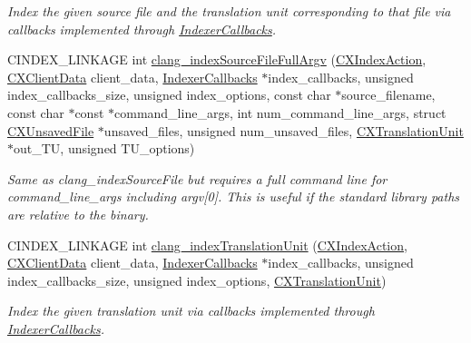 \begin{DoxyCompactItemize}
\begin{DoxyCompactList}\small\item\em Index the given source file and the translation unit corresponding to that file via callbacks implemented through \mbox{\hyperlink{structIndexerCallbacks}{Indexer\+Callbacks}}. \end{DoxyCompactList}\item 
\mbox{\label{group__CINDEX__HIGH_ga3b08166c97a48146a4a0395876332327}} 
C\+I\+N\+D\+E\+X\+\_\+\+L\+I\+N\+K\+A\+GE int \mbox{\hyperlink{group__CINDEX__HIGH_ga3b08166c97a48146a4a0395876332327}{clang\+\_\+index\+Source\+File\+Full\+Argv}} (\mbox{\hyperlink{group__CINDEX__HIGH_gac8d30d3e3fb34d887b611e7c6de3afb6}{C\+X\+Index\+Action}}, \mbox{\hyperlink{group__CINDEX_gacfa40c3de26d228c0d898403c2c21612}{C\+X\+Client\+Data}} client\+\_\+data, \mbox{\hyperlink{structIndexerCallbacks}{Indexer\+Callbacks}} $\ast$index\+\_\+callbacks, unsigned index\+\_\+callbacks\+\_\+size, unsigned index\+\_\+options, const char $\ast$source\+\_\+filename, const char $\ast$const $\ast$command\+\_\+line\+\_\+args, int num\+\_\+command\+\_\+line\+\_\+args, struct \mbox{\hyperlink{structCXUnsavedFile}{C\+X\+Unsaved\+File}} $\ast$unsaved\+\_\+files, unsigned num\+\_\+unsaved\+\_\+files, \mbox{\hyperlink{group__CINDEX_gacdb7815736ca709ce9a5e1ec2b7e16ac}{C\+X\+Translation\+Unit}} $\ast$out\+\_\+\+TU, unsigned T\+U\+\_\+options)
\begin{DoxyCompactList}\small\item\em Same as clang\+\_\+index\+Source\+File but requires a full command line for {\ttfamily command\+\_\+line\+\_\+args} including argv\mbox{[}0\mbox{]}. This is useful if the standard library paths are relative to the binary. \end{DoxyCompactList}\item 
C\+I\+N\+D\+E\+X\+\_\+\+L\+I\+N\+K\+A\+GE int \mbox{\hyperlink{group__CINDEX__HIGH_gab12a0795c7d7be6e7ec85679faf3f8e9}{clang\+\_\+index\+Translation\+Unit}} (\mbox{\hyperlink{group__CINDEX__HIGH_gac8d30d3e3fb34d887b611e7c6de3afb6}{C\+X\+Index\+Action}}, \mbox{\hyperlink{group__CINDEX_gacfa40c3de26d228c0d898403c2c21612}{C\+X\+Client\+Data}} client\+\_\+data, \mbox{\hyperlink{structIndexerCallbacks}{Indexer\+Callbacks}} $\ast$index\+\_\+callbacks, unsigned index\+\_\+callbacks\+\_\+size, unsigned index\+\_\+options, \mbox{\hyperlink{group__CINDEX_gacdb7815736ca709ce9a5e1ec2b7e16ac}{C\+X\+Translation\+Unit}})
\begin{DoxyCompactList}\small\item\em Index the given translation unit via callbacks implemented through \mbox{\hyperlink{structIndexerCallbacks}{Indexer\+Callbacks}}. \end{DoxyCompactList}\item 

\end{DoxyCompactItemize}
